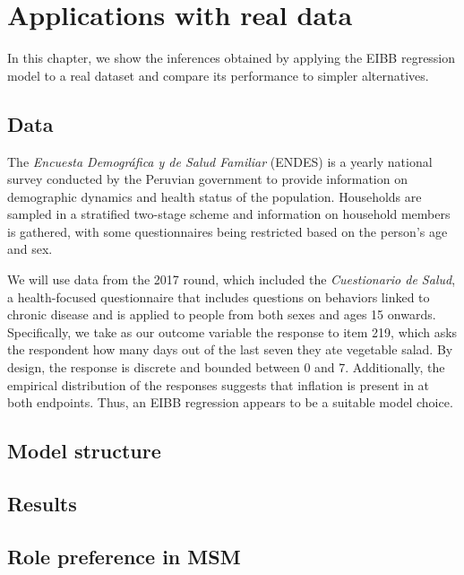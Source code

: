 \chapter{Applications with real data}
\label{cap:applications}

In this chapter, we show the inferences obtained by applying the EIBB regression model to a real dataset and compare its performance to simpler alternatives.

\section{Data}
\label{sec:applications-data}

The \textit{Encuesta Demogr\'afica y de Salud Familiar} (ENDES) is a yearly national survey conducted by the Peruvian government to provide information on demographic dynamics and health status of the population. Households are sampled in a stratified two-stage scheme and information on household members is gathered, with some questionnaires being restricted based on the person's age and sex.

We will use data from the 2017 round, which included the \textit{Cuestionario de Salud}, a health-focused questionnaire that includes questions on behaviors linked to chronic disease and is applied to people from both sexes and ages 15 onwards. Specifically, we take as our outcome variable the response to item 219, which asks the respondent how many days out of the last seven they ate vegetable salad. By design, the response is discrete and bounded between 0 and 7. Additionally, the empirical distribution of the responses suggests that inflation is present in at both endpoints. Thus, an EIBB regression appears to be a suitable model choice.

\section{Model structure}
\label{sec:applications-structure}

\section{Results}
\label{sec:applications-results}



\section{Role preference in MSM}
\label{sec:sexmsm}